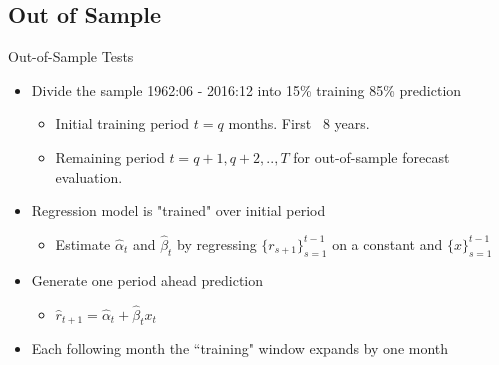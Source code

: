 \documentclass{beamer}
\begin{document}
%			

\subsection{Out of Sample}
\begin{frame}{Out-of-Sample Tests}
	\begin{itemize}[<+->]
		\item Divide the sample 1962:06 - 2016:12 into 15\% training 85\% prediction
		\begin{itemize}
			\item Initial training period $t = q$ months. First ~8 years.
			\item Remaining period $t = q+1, q+2,..,T$ for out-of-sample forecast evaluation.
		\end{itemize}
		\item Regression model is "trained" over initial period
		\begin{itemize}
			\item Estimate $\hat \alpha_{t}$ and $\hat \beta_{t}$ by regressing $\{r_{s+1}\}_{s=1}^{t-1}$ on a constant and $\{x\}_{s=1}^{t-1}$
		\end{itemize}
		\item Generate one period ahead prediction \\
		\begin{itemize}
			\item $\hat r_{t+1} = \hat \alpha_{t} + \hat \beta_{t}x_{t}$
		\end{itemize}
		\item Each following month the ``training" window expands by one month
	\end{itemize}
\end{frame}
\end{document}
